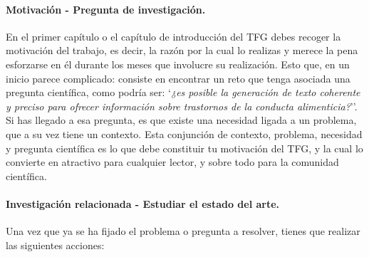 \paragraph{Motivación - Pregunta de investigación\textnormal{.}} En el primer capítulo o el capítulo de introducción del TFG debes recoger la motivación del trabajo, es decir, la razón por la cual lo realizas y merece la pena esforzarse en él durante los meses que involucre su realización. Esto que, en un inicio parece complicado: consiste en encontrar un reto que tenga asociada una pregunta científica, como podría ser: `\textit{¿es posible la generación de texto coherente y preciso para ofrecer información sobre trastornos de la conducta alimenticia?}''. Si has llegado a esa pregunta, es que existe una necesidad ligada a un problema, que a su vez tiene un contexto. Esta conjunción de contexto, problema, necesidad y pregunta científica es lo que debe constituir tu motivación del TFG, y la cual lo convierte en atractivo para cualquier lector, y sobre todo para la comunidad científica.

\paragraph{Investigación relacionada - Estudiar el estado del arte\textnormal{.}} Una vez que ya se ha fijado el problema o pregunta a resolver, tienes que realizar las siguientes acciones:


